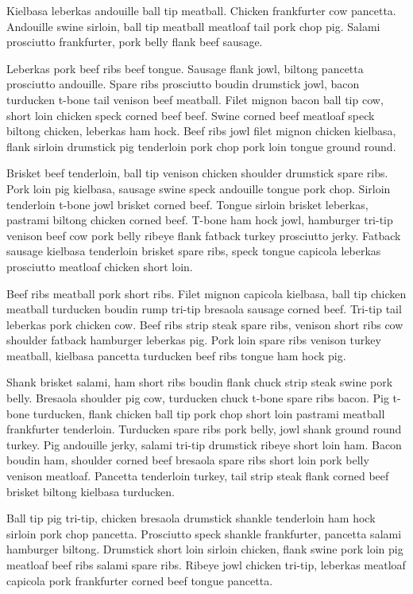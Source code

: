 Kielbasa leberkas andouille ball tip meatball. Chicken frankfurter cow pancetta. Andouille swine sirloin, ball tip meatball meatloaf tail pork chop pig. Salami prosciutto frankfurter, pork belly flank beef sausage.

Leberkas pork beef ribs beef tongue. Sausage flank jowl, biltong pancetta prosciutto andouille. Spare ribs prosciutto boudin drumstick jowl, bacon turducken t-bone tail venison beef meatball. Filet mignon bacon ball tip cow, short loin chicken speck corned beef beef. Swine corned beef meatloaf speck biltong chicken, leberkas ham hock. Beef ribs jowl filet mignon chicken kielbasa, flank sirloin drumstick pig tenderloin pork chop pork loin tongue ground round.

Brisket beef tenderloin, ball tip venison chicken shoulder drumstick spare ribs. Pork loin pig kielbasa, sausage swine speck andouille tongue pork chop. Sirloin tenderloin t-bone jowl brisket corned beef. Tongue sirloin brisket leberkas, pastrami biltong chicken corned beef. T-bone ham hock jowl, hamburger tri-tip venison beef cow pork belly ribeye flank fatback turkey prosciutto jerky. Fatback sausage kielbasa tenderloin brisket spare ribs, speck tongue capicola leberkas prosciutto meatloaf chicken short loin.

Beef ribs meatball pork short ribs. Filet mignon capicola kielbasa, ball tip chicken meatball turducken boudin rump tri-tip bresaola sausage corned beef. Tri-tip tail leberkas pork chicken cow. Beef ribs strip steak spare ribs, venison short ribs cow shoulder fatback hamburger leberkas pig. Pork loin spare ribs venison turkey meatball, kielbasa pancetta turducken beef ribs tongue ham hock pig.

Shank brisket salami, ham short ribs boudin flank chuck strip steak swine pork belly. Bresaola shoulder pig cow, turducken chuck t-bone spare ribs bacon. Pig t-bone turducken, flank chicken ball tip pork chop short loin pastrami meatball frankfurter tenderloin. Turducken spare ribs pork belly, jowl shank ground round turkey. Pig andouille jerky, salami tri-tip drumstick ribeye short loin ham. Bacon boudin ham, shoulder corned beef bresaola spare ribs short loin pork belly venison meatloaf. Pancetta tenderloin turkey, tail strip steak flank corned beef brisket biltong kielbasa turducken.

Ball tip pig tri-tip, chicken bresaola drumstick shankle tenderloin ham hock sirloin pork chop pancetta. Prosciutto speck shankle frankfurter, pancetta salami hamburger biltong. Drumstick short loin sirloin chicken, flank swine pork loin pig meatloaf beef ribs salami spare ribs. Ribeye jowl chicken tri-tip, leberkas meatloaf capicola pork frankfurter corned beef tongue pancetta.

